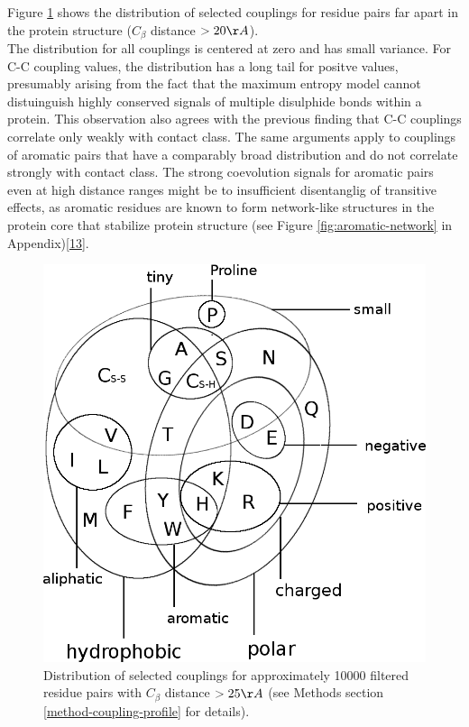 \documentclass[12pt,a4paper,twoside]{book}
\newcommand{\Cb}{C_\beta}
\theoremstyle{definition}
\theoremstyle{definition}
\theoremstyle{remark}
\begin{document}
Figure \ref{fig:1d-coupling-profile-20-50} shows the distribution of
selected couplings for residue pairs far apart in the protein structure
(\(\Cb\) distance \(> 20\AA\)).\\
The distribution for all couplings is centered at zero and has small
variance. For C-C coupling values, the distribution has a long tail for
positve values, presumably arising from the fact that the maximum
entropy model cannot distuinguish highly conserved signals of multiple
disulphide bonds within a protein. This observation also agrees with the
previous finding that C-C couplings correlate only weakly with contact
class. The same arguments apply to couplings of aromatic pairs that have
a comparably broad distribution and do not correlate strongly with
contact class. The strong coevolution signals for aromatic pairs even at
high distance ranges might be to insufficient disentanglig of transitive
effects, as aromatic residues are known to form network-like structures
in the protein core that stabilize protein structure (see Figure
\ref{fig:aromatic-network} in
Appendix){[}\protect\hyperlink{ref-Burley1985}{13}{]}.






\begin{figure}
\includegraphics[width=1\linewidth]{img/amino_acid_physico_chemical_properties_venn_diagramm} \caption{Distribution of selected
couplings for approximately 10000 filtered residue pairs with \(\Cb\)
distance \(> 25\AA\) (see Methods section \ref{method-coupling-profile}
for details).}\label{fig:1d-coupling-profile-20-50}
\end{figure}
\end{document}
